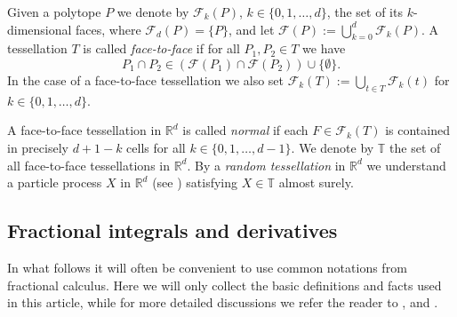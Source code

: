 \documentclass[11pt,a4paper]{article}
\theoremstyle{plain}
\theoremstyle{definition}
\theoremstyle{remark}
\def\RR{\mathbb{R}}
\def\TT{\mathbb{T}}
\def\cF{\mathcal{F}}
\begin{document}
Given a polytope $P$ we denote by $\cF_k(P)$, $k\in\{0,1,\ldots,d\}$, the set of its $k$-dimensional faces, where $\cF_d(P)=\{P\}$, and let $\cF(P):=\bigcup_{k=0}^{d}\cF_{k}(P)$. A tessellation $T$ is called {\textit{face-to-face}} if for all $P_1,P_2\in T$ we have
\[
    P_1\cap P_2\in(\cF(P_1)\cap\cF(P_2))\cup\{\emptyset\}.
\]
In the case of a face-to-face tessellation we also set $\cF_k(T):=\bigcup_{t\in T}\cF_k(t)$ for $k\in \{0,1,\dots,d\}$.

A face-to-face tessellation in $\RR^d$ is called {\textit{normal}} if each $F\in\cF_k(T)$ is contained in precisely $d+1-k$ cells for all $k\in\{0,1,\ldots,d-1\}$. We denote by $\TT$ the set of all face-to-face tessellations in $\RR^d$. By a {\textit{random tessellation}} in $\RR^d$ we understand a particle process $X$ in $\RR^d$ (see \cite[Section~4.1]{SW}) satisfying $X\in\TT$ almost surely.



\subsection{Fractional integrals and derivatives}\label{sec:FractionalIntegrals}
In what follows it will often be convenient to use common notations from fractional calculus. Here we will only collect the basic definitions and facts used in this article, while for more detailed discussions we refer the reader to \cite{samko1993fractional}, \cite{miller1993introduction} and \cite{TAFDE}.
\end{document}
